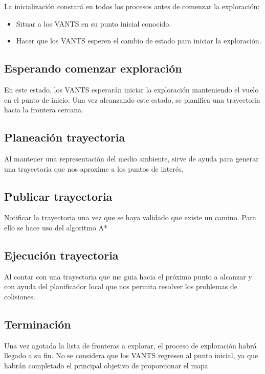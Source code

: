 La inicialización constará en todos los procesos antes de comenzar la exploración:
\begin{itemize}\setlength{\itemsep}{-1mm}
\item Situar a los VANTS en su punto inicial conocido.
\item Hacer que los VANTS esperen el cambio de estado para iniciar la exploración.
\end{itemize}

\subsection*{Esperando comenzar exploración}

En este estado, los VANTS esperarán iniciar la exploración manteniendo el vuelo en el punto de inicio.
Una vez alcanzando este estado, se planifica una trayectoria hacia la frontera cercana.
\subsection*{Planeación trayectoria}

Al mantener una representación del medio ambiente, sirve de ayuda para generar una trayectoria que nos aproxime a los puntos de interés.

\subsection*{Publicar trayectoria}

Notificar la trayectoria una vez que se haya validado que existe un camino. Para ello se hace uso del algoritmo A* 

\subsection*{Ejecución trayectoria}

Al contar con una trayectoria que me guia hacia el próximo punto a alcanzar y con ayuda del planificador local que nos permita resolver los problemas de colisiones.


\subsection*{Terminación}

Una vez agotada la lista de fronteras a explorar, el proceso de exploración habrá llegado a su fin.
No se considera que los VANTS regresen al punto inicial, ya que habrán completado el principal objetivo de proporcionar el mapa.

